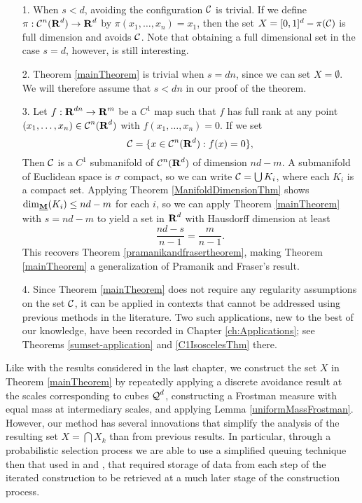 \begin{remarks}
	\
	\begin{enumerate}
		\item[1.] When $s < d$, avoiding the configuration $\operatorname{\mathcal{C}}$ is trivial. If we define $\pi: \operatorname{\mathcal{C}}^n(\operatorname{\mathbf{R}}^d) \to \operatorname{\mathbf{R}}^d$ by $\pi(x_1, \dots, x_n) = x_1$, then the set $X = [0,1]^d - \pi(\operatorname{\mathcal{C}})$ is full dimension and avoids $\operatorname{\mathcal{C}}$. Note that obtaining a full dimensional set in the case $s = d$, however, is still interesting.

		\item[2.] Theorem \ref{mainTheorem} is trivial when $s = dn$, since we can set $X = \emptyset$. We will therefore assume that $s < dn$ in our proof of the theorem.

		\item[3.] Let $f: \operatorname{\mathbf{R}}^{dn} \to \operatorname{\mathbf{R}}^m$ be a $C^1$ map such that $f$ has full rank at any point $(x_1, \dots, x_n) \in \operatorname{\mathcal{C}}^n(\operatorname{\mathbf{R}}^d)$ with $f(x_1, \dots, x_n) = 0$. If we set
		\[ \operatorname{\mathcal{C}} = \{ x \in \operatorname{\mathcal{C}}^n(\operatorname{\mathbf{R}}^d) : f(x) = 0 \}, \]
		Then $\operatorname{\mathcal{C}}$ is a $C^1$ submanifold of $\operatorname{\mathcal{C}}^n(\operatorname{\mathbf{R}}^d)$ of dimension $nd - m$. A submanifold of Euclidean space is $\sigma$ compact, so we can write $\operatorname{\mathcal{C}} = \bigcup K_i$, where each $K_i$ is a compact set. Applying Theorem \ref{ManifoldDimensionThm} shows $\operatorname{\dim_{\underline{\mathbf{M}}}}(K_i) \leq nd - m$ for each $i$, so we can apply Theorem \ref{mainTheorem} with $s = nd - m$ to yield a set in $\operatorname{\mathbf{R}}^d$ with Hausdorff dimension at least
		\[ \frac{nd - s}{n-1} = \frac{m}{n-1}. \]
		This recovers Theorem \ref{pramanikandfrasertheorem}, making Theorem \ref{mainTheorem} a generalization of Pramanik and Fraser's result.

		\item[4.] Since Theorem \ref{mainTheorem} does not require any regularity assumptions on the set $\operatorname{\mathcal{C}}$, it can be applied in contexts that cannot be addressed using previous methods in the literature. Two such applications, new to the best of our knowledge, have been recorded in Chapter \ref{ch:Applications}; see Theorems \ref{sumset-application} and \ref{C1IsoscelesThm} there.
	\end{enumerate}
\end{remarks}

Like with the results considered in the last chapter, we construct the set $X$ in Theorem \ref{mainTheorem} by repeatedly applying a discrete avoidance result at the scales corresponding to cubes $\operatorname{\mathcal{Q}}^d$, constructing a Frostman measure with equal mass at intermediary scales, and applying Lemma \ref{uniformMassFrostman}. However, our method has several innovations that simplify the analysis of the resulting set $X = \bigcap X_k$ than from previous results. In particular, through a probabilistic selection process we are able to use a simplified queuing technique then that used in \cite{KeletiDimOneSet} and \cite{MalabikaRob}, that required storage of data from each step of the iterated construction to be retrieved at a much later stage of the construction process.

